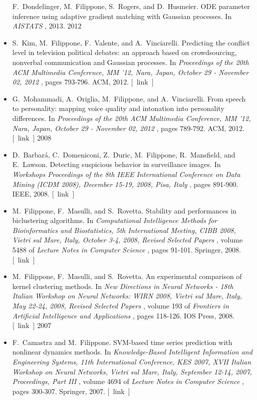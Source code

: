 \documentclass[10pt]{article}
\begin{document}
\begin{itemize}
  F. Dondelinger, M. Filippone, S. Rogers, and D. Husmeier. ODE parameter inference using adaptive gradient matching with Gaussian processes. In \emph{AISTATS}
, 2013. 
2012
\item 

  S. Kim, M. Filippone, F. Valente, and A. Vinciarelli. Predicting the conflict level in television political debates: an approach based on crowdsourcing, nonverbal communication and Gaussian processes. In \emph{Proceedings of the 20th ACM Multimedia Conference, MM '12, Nara, Japan, October 29 - November 02, 2012}
, pages 793-796. ACM, 2012. [ link ] 

\item 

  G. Mohammadi, A. Origlia, M. Filippone, and A. Vinciarelli. From speech to personality: mapping voice quality and intonation into personality differences. In \emph{Proceedings of the 20th ACM Multimedia Conference, MM '12, Nara, Japan, October 29 - November 02, 2012}
, pages 789-792. ACM, 2012. [ link ] 
2008
\item 

  D. Barbar\'a, C. Domeniconi, Z. Duric, M. Filippone, R. Mansfield, and E. Lawson. Detecting suspicious behavior in surveillance images. In \emph{Workshops Proceedings of the 8th IEEE International Conference on Data Mining (ICDM 2008), December 15-19, 2008, Pisa, Italy}
, pages 891-900. IEEE, 2008. [ link ] 

\item 

  M. Filippone, F. Masulli, and S. Rovetta. Stability and performances in biclustering algorithms. In \emph{Computational Intelligence Methods for Bioinformatics and Biostatistics, 5th International Meeting, CIBB 2008, Vietri sul Mare, Italy, October 3-4, 2008, Revised Selected Papers}
, volume 5488 of \emph{Lecture Notes in Computer Science}
, pages 91-101. Springer, 2008. [ link ] 

\item 

  M. Filippone, F. Masulli, and S. Rovetta. An experimental comparison of kernel clustering methods. In \emph{New Directions in Neural Networks - 18th Italian Workshop on Neural Networks: WIRN 2008, Vietri sul Mare, Italy, May 22-24, 2008, Revised Selected Papers}
, volume 193 of \emph{Frontiers in Artificial Intelligence and Applications}
, pages 118-126. IOS Press, 2008. [ link ] 
2007
\item 

  F. Camastra and M. Filippone. SVM-based time series prediction with nonlinear dynamics methods. In \emph{Knowledge-Based Intelligent Information and Engineering Systems, 11th International Conference, KES 2007, XVII Italian Workshop on Neural Networks, Vietri sul Mare, Italy, September 12-14, 2007, Proceedings, Part III}
, volume 4694 of \emph{Lecture Notes in Computer Science}
, pages 300-307. Springer, 2007. [ link ] 


\end{itemize}
\end{document}
